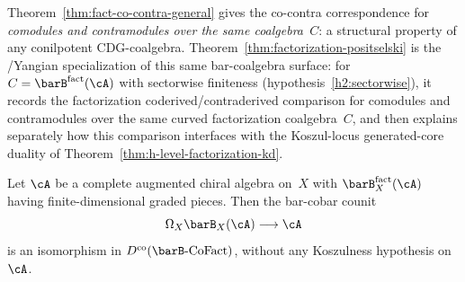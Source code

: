 \begin{remark}
\label{rem:fact-positselski-comparison}
Theorem~\ref{thm:fact-co-contra-general} gives the co-contra
correspondence for \emph{comodules and contramodules over the
same coalgebra~$C$}: a structural property of any conilpotent
CDG-coalgebra.
Theorem~\ref{thm:factorization-positselski} is the
\Eone/Yangian specialization of this same bar-coalgebra surface:
for $C = \barB^{\mathrm{fact}}(\cA)$ with sectorwise finiteness
\textup{(}hypothesis~\ref{h2:sectorwise}\textup{)}, it records the
factorization coderived/contraderived comparison for comodules and
contramodules over the same curved factorization coalgebra~$C$, and
then explains separately how this comparison interfaces with the
Koszul-locus generated-core duality of
Theorem~\ref{thm:h-level-factorization-kd}.
\end{remark}

\begin{theorem}
\label{thm:off-koszul-ran-inversion}
Let $\cA$ be a complete augmented chiral algebra on~$X$ with
$\barB_X^{\mathrm{fact}}(\cA)$ having finite-dimensional graded
pieces.  Then the bar-cobar counit
\[
\Omega_X \barB_X(\cA) \longrightarrow \cA
\]
is an isomorphism in
$D^{\mathrm{co}}(\barB\text{-}\mathrm{CoFact})$,
without any Koszulness hypothesis on~$\cA$.
\end{theorem}

